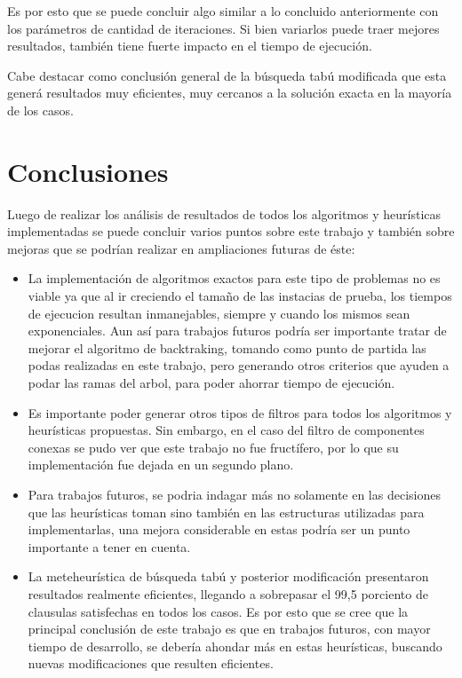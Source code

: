 \documentclass[a4paper,10pt]{article}
\begin{document}
Es por esto que se puede concluir algo similar a lo concluido anteriormente con los par\'ametros de cantidad de iteraciones. Si bien variarlos puede traer mejores resultados, tambi\'en tiene fuerte impacto en el tiempo de ejecuci\'on. 

Cabe destacar como conclusi\'on general de la b\'usqueda tab\'u modificada que esta gener\'a resultados muy eficientes, muy cercanos a la soluci\'on exacta en la mayor\'ia de los casos.



\section*{Conclusiones}

Luego de realizar los an\'alisis de resultados de todos los algoritmos y heur\'isticas implementadas se puede concluir varios puntos sobre este trabajo y tambi\'en sobre mejoras que se podr\'ian realizar en ampliaciones futuras de \'este:

\begin{itemize}
\item La implementaci\'on de algoritmos exactos para este tipo de problemas no es viable ya que al ir creciendo el tama\~{n}o de las instacias de prueba, los tiempos de ejecucion resultan inmanejables, siempre y cuando los mismos sean exponenciales. Aun as\'i para trabajos futuros podr\'ia ser importante tratar de mejorar el algoritmo de backtraking, tomando como punto de partida las podas realizadas en este trabajo, pero generando otros criterios que ayuden a podar las ramas del arbol, para poder ahorrar tiempo de ejecuci\'on.
\item Es importante poder generar otros tipos de filtros para todos los algoritmos y heur\'isticas propuestas. Sin embargo, en el caso del filtro de componentes conexas se pudo ver que este trabajo no fue fruct\'ifero, por lo que su implementaci\'on fue dejada en un segundo plano.
\item Para trabajos futuros, se podria indagar m\'as no solamente en las decisiones que las heur\'isticas toman sino tambi\'en en las estructuras utilizadas para implementarlas, una mejora considerable en estas podr\'ia ser un punto importante a tener en cuenta.
\item La meteheur\'istica de b\'usqueda tab\'u y posterior modificaci\'on presentaron resultados realmente eficientes, llegando a sobrepasar el 99,5 porciento de clausulas satisfechas en todos los casos. Es por esto que se cree que la principal conclusi\'on de este trabajo es que en trabajos futuros, con mayor tiempo de desarrollo, se deber\'ia ahondar m\'as en estas heur\'isticas, buscando nuevas modificaciones que resulten eficientes. 
\end{itemize}
\end{document}
